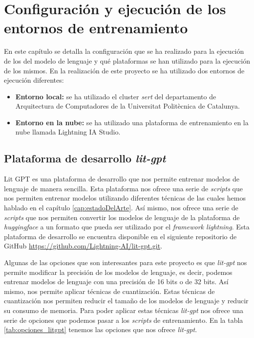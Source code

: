 \chapter{Configuración y ejecución de los entornos de entrenamiento}
\label{cap:configuracion_ejecucion}


En este capítulo se detalla la configuración que se ha realizado para la ejecución de los
del modelo de lenguaje y qué plataformas se han utilizado para la ejecución de los mismos.
En la realización de este proyecto se ha utilizado dos entornos de ejecución diferentes:

\begin{itemize}
    \item \textbf{Entorno local:} se ha utilizado el cluster \textit{sert} del departamento
        de Arquitectura de Computadores de la Universitat Politècnica de Catalunya.
    \item \textbf{Entorno en la nube:} se ha utilizado una plataforma de entrenamiento en la nube
        llamada Lightning IA Studio.
\end{itemize}

\section{Plataforma de desarrollo \textit{lit-gpt}}
\label{sec:lit_gpt}


Lit GPT es una plataforma de desarrollo que nos permite entrenar modelos de
lenguaje de manera sencilla. Esta plataforma nos ofrece una serie de \textit{scripts} que nos
permiten entrenar modelos utilizando diferentes técnicas de las cuales hemos hablado
en el capítulo \ref{cap:estadoDelArte}. Así mismo, nos ofrece una serie de \textit{scripts} que nos permiten convertir
los modelos de lenguaje de la plataforma de \textit{huggingface} a un formato que pueda
ser utilizado por el \textit{framework lightning}. Esta plataforma de desarrollo se encuentra
disponible en el siguiente repositorio de GitHub \url{https://github.com/Lightning-AI/lit-gpt.git}.

Algunas de las opciones que son interesantes para este proyecto es que \textit{lit-gpt} nos
permite modificar la precisión de los modelos de lenguaje, es decir, podemos entrenar
modelos de lenguaje con una precisión de 16 bits o de 32 bits. Así mismo, nos permite
aplicar técnicas de cuantización. Estas técnicas de cuantización nos permiten reducir
el tamaño de los modelos de lenguaje y reducir su consumo de memoria.
Para poder aplicar estas técnicas \textit{lit-gpt} nos ofrece una serie de opciones que
podemos pasar a los \textit{scripts} de entrenamiento. En la tabla \ref{tab:opciones_litgpt} 
tenemos las opciones que nos ofrece \textit{lit-gpt}.

